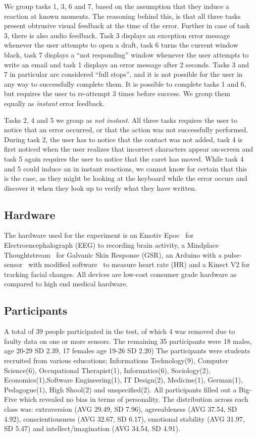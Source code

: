 We group tasks 1, 3, 6 and 7, based on the assumption that they induce a reaction at known moments. The reasoning behind this, is that all three tasks present obtrusive visual feedback at the time of the error. Further in case of task 3, there is also audio
feedback. Task 3 displays an exception error message whenever the user attempts to open a draft, task 6 turns the
current window
black, task 7 displays a ``not responding'' window whenever the user attempts to write an email and task 1 displays an
error message after 2 seconds. Tasks 3 and 7 in particular are considered ``full stops'', and it is not possible for the
user in any way to successfully complete them. It is possible to complete tasks 1 and 6, but requires the user to
re-attempt 3 times before success. We group them equally as \textit{instant} error feedback.

Tasks 2, 4 and 5 we group as \textit{not instant}. All three tasks requires the user to notice that an error occurred, or
that the action was not successfully performed. During task 2, the user has to notice that the contact was not added,
task 4 is first noticed when the user realizes that incorrect characters appear on-screen and task 5 again requires the
user to notice that the caret has moved. While task 4 and 5 could induce an in instant reactions, we cannot know for
certain that this is the case, as they might be looking at the keyboard while the error occurs and discover it when they look up to verify what they have written.

\subsection{Hardware}
The hardware used for the experiment is an Emotiv Epoc~\cite{emotiv_epoc_website} for Electroencephalograph (EEG) to recording brain activity, a Mindplace Thoughtstream~\cite{thoughtstream} for Galvanic Skin Response (GSR), an Arduino with a pulse-sensor~\cite{pulsesensor} with modified software~\cite{pulsesensorgit} to measure heart rate (HR) and a Kinect V2\cite{kinect_specs3} for tracking facial changes.
All devices are low-cost consumer grade hardware as compared to high end medical hardware.

\subsection{Participants}
A total of 39 people participated in the test, of which 4 was removed due to faulty data on one or more sensors.
The remaining 35 participants were 18 males, age 20-29 SD 2.39, 17 females age 19-26 SD 2.20)
The participants were students recruited from various educations; Informations Technology(9), Computer Science(6), Occupational Therapist(1), Informatics(6), Sociology(2), Economics(1),Software Engineering(1), IT Design(2), Medicine(1), German(1), Pedagogue(1), High Shool(2) and unspecified(2).
All participants filled out a Big-Five\cite{big5} which revealed no bias in terms of personality. 
The distribution across each class was: extraversion (AVG 29.49, SD 7.96), agreeableness (AVG 37.54, SD 4.92), conscientiousness (AVG 32.67, SD 6.17), emotional stability (AVG 31.97, SD 5.47) and intellect/imagination (AVG 34.54, SD 4.91).

